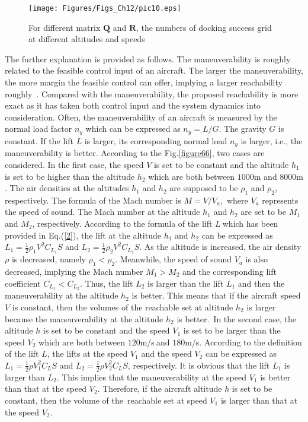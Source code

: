 \begin{figure}[ptb]
	\begin{center}
		\texttt{[image: Figures/Figs\_Ch12/pic10.eps]}
	\end{center}
	\caption{For different matrix $\mathbf{Q}$ and $\mathbf{R}$, the numbers of
		docking success grid at different altitudes and speeds}
	\label{figure88}
\end{figure}

The further explanation is provided as follows. The maneuverability is
roughly related to the feasible control input of an aircraft. The larger the
maneuverability, the more margin the feasible control can offer, implying a
larger reachability roughly\ \cite{25}. Compared with the maneuverability,
the proposed reachability is more exact as it has taken both control input
and the system dynamics into consideration. Often, the maneuverability of an
aircraft is measured by the normal load factor $n_{y}$ which can be
expressed as $n_{y}=L/G$. The gravity $G$ is constant. If the lift $L$ is
larger, its corresponding normal load $n_{y}$ is larger, i.e., the
maneuverability is better. According to the Fig.\ref{figure66}, two cases
are considered. In the first case, the speed $V$ is set to be constant and
the altitude $h_{1}$ is set to be higher than the altitude $h_{2}$ which are
both between $1000$m and $8000$m$.$ The air densities at the altitudes $%
h_{1} $ and $h_{2}$ are supposed to be $\rho_{1}$ and $\rho_{2}$,
respectively. The formula of the Mach number is $M=V/V_{a},$ where $V_{a}$
represents the speed of sound. The Mach number at the altitude $h_{1}$ and $%
h_{2}$ are set to be $M_{1}$ and $M_{2}$, respectively. According to the
formula of the lift $L\ $which has been provided in Eq.(\ref{2}), the lift
at the altitude $h_{1}$ and $h_{2}$ can be expressed as $L_{1}=\frac{1}{2}%
\rho_{1}V^{2}C_{L_{1}}S$ and $L_{2}=\frac{1}{2}\rho_{2}V^{2}C_{L_{2}}S$. As
the altitude is increased, the air density $\rho$ is decreased, namely $%
\rho_{1}<\rho_{2}$. Meanwhile, the speed of sound $V_{a}$ is also decreased,
implying the Mach number $M_{1}>M_{2}$ and the corresponding lift
coefficient $C_{L_{1}}<C_{L_{2}}$. Thus, the lift $L_{2}$ is larger than the
lift $L_{1}$ and then the maneuverability at the altitude $h_{2}$ is better.
This means that if the aircraft speed $V$ is constant, then the volumes of
the reachable set at altitude $h_{2}$ is larger because the maneuverability
at the altitude $h_{2}$ is better.\ In the second case, the altitude $h$ is
set to be constant and the speed $V_{1}$ is set to be larger than the speed $%
V_{2}$ which are both between $120$m/s$\ $and $180$m/s. According to the
definition of the lift $L$, the lifts at the speed $V_{1}$ and the speed $%
V_{2}$ can be expressed as $L_{1}=\frac{1}{2}\rho V_{1}^{2}C_{L}S$ and $%
L_{2}=\frac{1}{2}\rho V_{2}^{2}C_{L}S$, respectively. It is obvious that the
lift $L_{1}$ is larger than $L_{2}$. This implies that the maneuverability
at the speed $V_{1}$ is better than that at the speed $V_{2}$. Therefore, if
the aircraft altitude $h$ is set to be constant, then the volume of the\
reachable set at speed $V_{1}$ is larger than that at the speed $V_{2}$.

